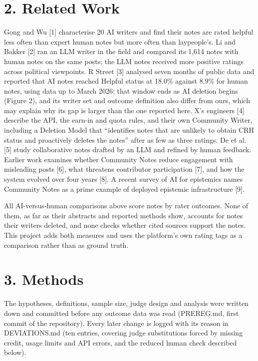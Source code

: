 \documentclass[10.5pt]{article}
\begin{document}
\section*{2. Related Work}
Gong and Wu [1] characterise 20 AI writers and find their notes are rated helpful less often than expert human notes but more often than laypeople's. Li and Bakker [2] ran an LLM writer in the field and compared its 1,614 notes with human notes on the same posts; the LLM notes received more positive ratings across political viewpoints. R Street [3] analysed seven months of public data and reported that AI notes reached Helpful status at 18.0\% against 8.9\% for human notes, using data up to March 2026; that window ends as AI deletion begins (Figure 2), and its writer set and outcome definition also differ from ours, which may explain why its gap is larger than the one reported here. X's engineers [4] describe the API, the earn-in and quota rules, and their own Community Writer, including a Deletion Model that ``identifies notes that are unlikely to obtain CRH status and proactively deletes the notes'' after as few as three ratings. De et al. [5] study collaborative notes drafted by an LLM and refined by human feedback. Earlier work examines whether Community Notes reduce engagement with misleading posts [6], what threatens contributor participation [7], and how the system evolved over four years [8]. A recent survey of AI for epistemics names Community Notes as a prime example of deployed epistemic infrastructure [9].

All AI-versus-human comparisons above score notes by rater outcomes. None of them, as far as their abstracts and reported methods show, accounts for notes their writers deleted, and none checks whether cited sources support the notes. This project adds both measures and uses the platform's own rating tags as a comparison rather than as ground truth.

\section*{3. Methods}
The hypotheses, definitions, sample size, judge design and analysis were written down and committed before any outcome data was read (PREREG.md, first commit of the repository). Every later change is logged with its reason in DEVIATIONS.md (ten entries, covering judge substitutions forced by missing credit, usage limits and API errors, and the reduced human check described below).
\end{document}
